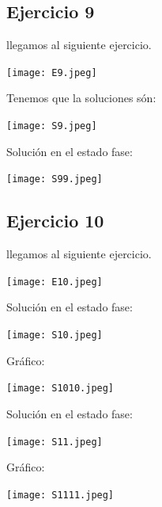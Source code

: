 \documentclass[12pt]{article}
\begin{document}


\subsection*{Ejercicio 9}
llegamos al siguiente ejercicio.

\begin{center}
    \texttt{[image: E9.jpeg]}
\end{center}

Tenemos que la soluciones són:

\begin{center}
    \texttt{[image: S9.jpeg]}
\end{center}

Solución en el estado fase:

\begin{center}
    \texttt{[image: S99.jpeg]}
\end{center}



\subsection*{Ejercicio 10}
llegamos al siguiente ejercicio.

\begin{center}
    \texttt{[image: E10.jpeg]}
\end{center}

Solución en el estado fase:

\begin{center}
    \texttt{[image: S10.jpeg]}
\end{center}

Gráfico:

\begin{center}
    \texttt{[image: S1010.jpeg]}
\end{center}

Solución en el estado fase:

\begin{center}
    \texttt{[image: S11.jpeg]}
\end{center}

Gráfico:

\begin{center}
    \texttt{[image: S1111.jpeg]}
\end{center}




\end{document}
